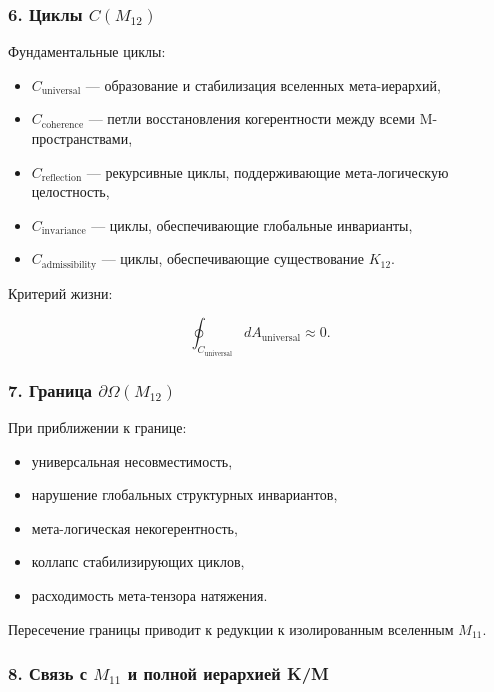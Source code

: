 \subsubsection*{6. Циклы $C(M_{12})$}

Фундаментальные циклы:

\begin{itemize}
    \item $C_{\mathrm{universal}}$ — образование и стабилизация вселенных мета-иерархий,
    \item $C_{\mathrm{coherence}}$ — петли восстановления когерентности между всеми M-пространствами,
    \item $C_{\mathrm{reflection}}$ — рекурсивные циклы, поддерживающие мета-логическую целостность,
    \item $C_{\mathrm{invariance}}$ — циклы, обеспечивающие глобальные инварианты,
    \item $C_{\mathrm{admissibility}}$ — циклы, обеспечивающие существование $K_{12}$.
\end{itemize}

Критерий жизни:

\[
\oint_{C_{\mathrm{universal}}} dA_{\mathrm{universal}} \approx 0.
\]

\subsubsection*{7. Граница $\partial\Omega(M_{12})$}

При приближении к границе:

\begin{itemize}
    \item универсальная несовместимость,
    \item нарушение глобальных структурных инвариантов,
    \item мета-логическая некогерентность,
    \item коллапс стабилизирующих циклов,
    \item расходимость мета-тензора натяжения.
\end{itemize}

Пересечение границы приводит к редукции к изолированным вселенным $M_{11}$.

\subsubsection*{8. Связь с $M_{11}$ и полной иерархией K/M}


